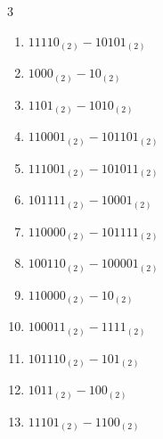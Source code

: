 \begin{multicols}{3}
\begin{enumerate}

  \item $11110_{(2)} - 10101_{(2)}$


  \item $1000_{(2)} - 10_{(2)}$


  \item $1101_{(2)} - 1010_{(2)}$


  \item $110001_{(2)} - 101101_{(2)}$


  \item $111001_{(2)} - 101011_{(2)}$


  \item $101111_{(2)} - 10001_{(2)}$


\columnbreak %

\resetques

  \item $110000_{(2)} - 101111_{(2)}$


  \item $100110_{(2)} - 100001_{(2)}$


  \item $110000_{(2)} - 10_{(2)}$


  \item $100011_{(2)} - 1111_{(2)}$


  \item $101110_{(2)} - 101_{(2)}$


  \item $1011_{(2)} - 100_{(2)}$


  \item $11101_{(2)} - 1100_{(2)}$



\end{enumerate}
\end{multicols}
